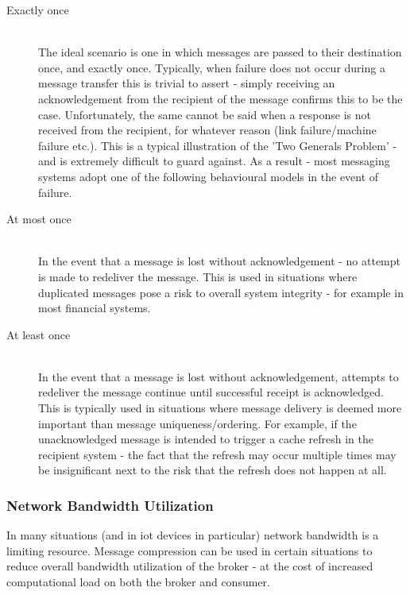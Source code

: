 \begin{description}
  \item[Exactly once] \hfill \\
    The ideal scenario is one in which messages are passed to their destination
    once, and exactly once. Typically, when failure does not occur during a
    message transfer this is trivial to assert - simply receiving an acknowledgement
    from the recipient of the message confirms this to be the case.
    Unfortunately, the same cannot be said when a response is not received from
    the recipient, for whatever reason (link failure/machine failure etc.).
    This is a typical illustration of the
    'Two Generals Problem'\cite{Gray:1978:NDB:647433.723863} - and is extremely
    difficult to guard against. As a result - most messaging systems adopt one
    of the following behavioural models in the event of failure.
  \item[At most once] \hfill \\
    In the event that a message is lost without acknowledgement - no attempt is made
    to redeliver the message. This is used in situations where duplicated messages
    pose a risk to overall system integrity - for example in most financial systems.
  \item[At least once] \hfill \\
    In the event that a message is lost without acknowledgement, attempts to
    redeliver the message continue until successful receipt is acknowledged.
    This is typically used in situations where message delivery is deemed more
    important than message uniqueness/ordering. For example, if the unacknowledged
    message is intended to trigger a cache refresh in the recipient system - the
    fact that the refresh may occur multiple times may be insignificant next to
    the risk that the refresh does not happen at all.
\end{description}

\subsubsection{Network Bandwidth Utilization}
\label{subs:Network Bandwidth Utilization}

In many situations (and in \gls{iot} devices in particular) network bandwidth is
a limiting resource. Message compression can be used in certain situations to
reduce overall bandwidth utilization of the broker - at the cost of increased
computational load on both the broker and consumer.

